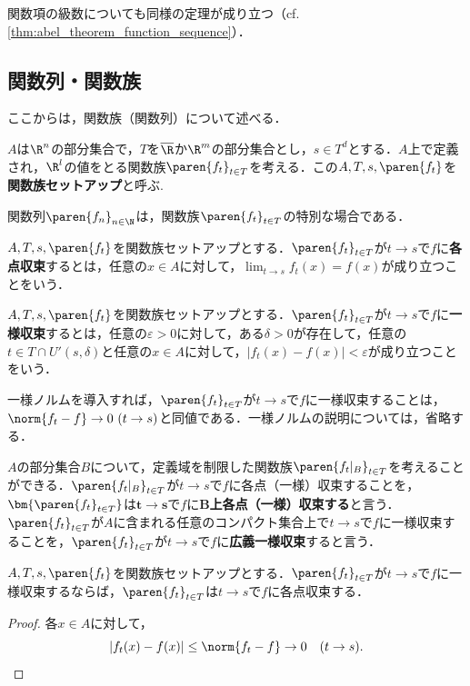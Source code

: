 \documentclass[a4paper,10pt]{ltjsarticle}
\begin{document}
関数項の級数についても同様の定理が成り立つ（cf. \cref{thm:abel_theorem_function_sequence}）．


\subsection{関数列・関数族}
\label{sec:function_family}

ここからは，関数族（関数列）について述べる．
\begin{MyDefinition}
  \(A\)は\(\R^n\)の部分集合で，\(T\)を\(\overline \R\)か\(\R^m\)の部分集合とし，\(s \in T^d\)とする．\(A\)上で定義され，\(\R^l\)の値をとる関数族\(\paren{f_t}_{t\in T}\)を考える．この\(A, T, s, \paren{f_t}\)を\textbf{関数族セットアップ}と呼ぶ.
\end{MyDefinition}
関数列\(\paren{f_n}_{n\in\N}\)は，関数族\(\paren{f_t}_{t\in T}\)の特別な場合である．

\begin{MyDefinition}
  \(A, T, s, \paren{f_t}\)を関数族セットアップとする．\(\paren{f_t}_{t\in T}\)が\(t \to s\)で\(f\)に\textbf{各点収束}するとは，任意の\(x \in A\)に対して，\(\lim_{t \to s}f_t(x) = f(x)\)が成り立つことをいう．
\end{MyDefinition}

\begin{MyDefinition}
  \(A, T, s, \paren{f_t}\)を関数族セットアップとする．\(\paren{f_t}_{t\in T}\)が\(t \to s\)で\(f\)に\textbf{一様収束}するとは，任意の\(\varepsilon > 0\)に対して，ある\(\delta > 0\)が存在して，任意の\(t \in T \cap U'(s, \delta)\)と任意の\(x \in A\)に対して，\(|f_t(x) - f(x)| < \varepsilon\)が成り立つことをいう．
\end{MyDefinition}

一様ノルムを導入すれば，\(\paren{f_t}_{t\in T}\)が\(t \to s\)で\(f\)に一様収束することは，\(\norm{f_t - f} \to 0 \ (t \to s)\)と同値である．一様ノルムの説明については，省略する．

\(A\)の部分集合\(B\)について，定義域を制限した関数族\(\paren{f_t|_B}_{t\in T}\)を考えることができる．\(\paren{f_t|_B}_{t\in T}\)が\(t \to s\)で\(f\)に各点（一様）収束することを，
\(\bm{\paren{f_t}_{t\in T}}\)は\(\bm{t \to s}\)で\(f\)に\textbf{\(\bm{B}\)上各点（一様）収束する}と言う．\(\paren{f_t}_{t\in T}\)が\(A\)に含まれる任意のコンパクト集合上で\(t \to s\)で\(f\)に一様収束することを，\(\paren{f_t}_{t\in T}\)が\(t \to s\)で\(f\)に\textbf{広義一様収束}すると言う．

\begin{MyProposition}
  \(A, T, s, \paren{f_t}\)を関数族セットアップとする．\(\paren{f_t}_{t\in T}\)が\(t \to s\)で\(f\)に一様収束するならば，\(\paren{f_t}_{t\in T}\)は\(t \to s\)で\(f\)に各点収束する．
\end{MyProposition}
\begin{proof}
  各\(x \in A\)に対して，
  \[ |f_t(x) - f(x)| \le \norm{f_t - f} \to 0 \quad (t \to s). \]
\end{proof}
\end{document}
